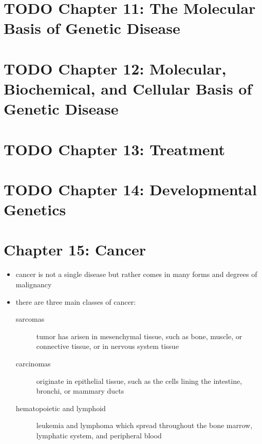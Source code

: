 \documentclass{scrartcl}
\begin{document}
\section{{\bfseries\sffamily TODO} Chapter 11: The Molecular Basis of Genetic Disease}
\label{sec:org0844343}
\section{{\bfseries\sffamily TODO} Chapter 12: Molecular, Biochemical, and Cellular Basis of Genetic Disease}
\label{sec:org26e0a73}
\section{{\bfseries\sffamily TODO} Chapter 13: Treatment}
\label{sec:orga9881b8}
\section{{\bfseries\sffamily TODO} Chapter 14: Developmental Genetics}
\label{sec:orgfd97973}
\section{Chapter 15: Cancer}
\label{sec:org908f841}
\begin{itemize}
\item cancer is not a single disease but rather comes in many forms and
degrees of malignancy
\item there are three main classes of cancer:
\begin{description}
\item[{sarcomas}] tumor has arisen in mesenchymal tissue, such as bone,
muscle, or connective tissue, or in nervous system
tissue
\item[{carcinomas}] originate in epithelial tissue, such as the cells
lining the intestine, bronchi, or mammary ducts
\item[{hematopoietic and lymphoid}] leukemia and lymphoma which spread
throughout the bone marrow, lymphatic system, and peripheral
blood
\end{description}
\end{itemize}
\end{document}
